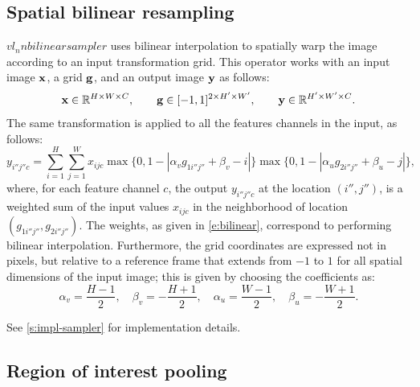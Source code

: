 \subsection{Spatial bilinear resampling}\label{s:spatial-sampler}

$vl_nnbilinearsampler$ uses bilinear interpolation to spatially warp the image according to an input transformation grid. This operator works with an input image $\mathbf{x}$, a grid $\mathbf{g}$, and an output image $\mathbf{y}$ as follows:
\[
\mathbf{x} \in \mathbb{R}^{H \times W \times C},
\qquad
\mathbf{g} \in [-1,1]^{2 \times H' \times W'},
\qquad
\mathbf{y} \in \mathbb{R}^{H' \times W' \times C}.
\]
The same transformation is applied to all the features channels in the input, as follows:
\begin{equation}\label{e:bilinear}
y_{i''j''c}
=
\sum_{i=1}^H
\sum_{j=1}^W
x_{ijc}
\max\{0, 1-|\alpha_v g_{1i''j''} + \beta_v - i|\}
\max\{0, 1-|\alpha_u g_{2i''j''} + \beta_u - j|\},
\end{equation}
where, for each feature channel $c$, the output $y_{i''j''c}$ at the location $(i'',j'')$, is a weighted sum of the input values $x_{ijc}$ in the neighborhood of location $(g_{1i''j''},g_{2i''j''})$. The weights, as given in \eqref{e:bilinear}, correspond to performing bilinear interpolation. Furthermore, the grid coordinates are expressed not in pixels, but relative to a reference frame that extends from $-1$ to $1$ for all spatial dimensions of the input image; this is given by choosing the coefficients as:
\[
\alpha_v = \frac{H-1}{2},\quad
\beta_v = -\frac{H+1}{2},\quad
\alpha_u = \frac{W-1}{2},\quad
\beta_u = -\frac{W+1}{2}.
\]

See \cref{s:impl-sampler} for implementation details.

\subsection{Region of interest pooling}\label{s:roi-pooling}

